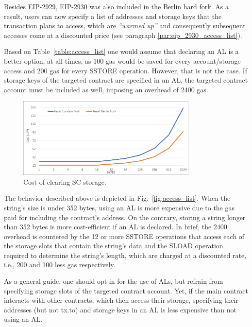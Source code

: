 Besides EIP-2929, EIP-2930 was also included in the Berlin hard fork. As a result, users can now specify a list of addresses and storage keys that the transaction plans to access, which are \emph{``warmed up''} and consequently subsequent accesses come at a discounted price (see paragraph \ref{par:eip_2930_access_list}).

Based on Table~\ref{table:access_list} one would assume that declaring an AL is a better option, at all times, as 100 gas would be saved for every account/storage access and 200 gas for every SSTORE operation. However, that is not the case. If storage keys of the targeted contract are specified in an AL, the targeted contract account must be included as well, imposing an overhead of 2400 gas.

\begin{figure}[htbp]
\centerline{\includegraphics[width=9cm]{figs/reset.pdf}}
\caption{Cost of clearing SC storage.}
\label{fig:reset}
\end{figure}

The behavior described above is depicted in Fig.~\ref{fig:access_list}. When the string’s size is under 352 bytes, using an AL is more expensive due to the gas paid for including the contract’s address. On the contrary, storing a string longer than 352 bytes is more cost-efficient if an AL is declared. In brief, the 2400 overhead is countered by the 12 or more SSTORE operations that access each of the storage slots that contain the string's data and the SLOAD operation required to determine the string's length, which are charged at a discounted rate, i.e., 200 and 100 less gas respectively.

As a general guide, one should opt in for the use of ALs, but refrain from specifying storage slots of the targeted contract account. Yet, if the main contract interacts with other contracts, which then access their storage, specifying their addresses (but not tx.to) and storage keys in an AL is less expensive than not using an AL.

